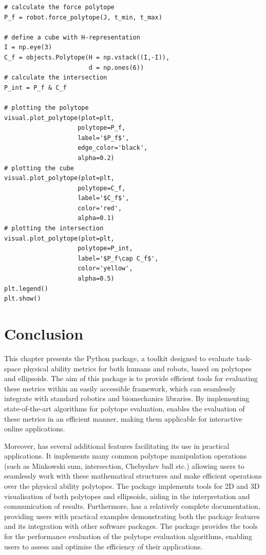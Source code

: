 {\begin{verbatim}
# calculate the force polytope
P_f = robot.force_polytope(J, t_min, t_max) 

# define a cube with H-representation
I = np.eye(3)
C_f = objects.Polytope(H = np.vstack((I,-I)), 
                       d = np.ones(6))  
# calculate the intersection
P_int = P_f & C_f
                    
# plotting the polytope
visual.plot_polytope(plot=plt, 
                    polytope=P_f, 
                    label='$P_f$',
                    edge_color='black',
                    alpha=0.2)
# plotting the cube
visual.plot_polytope(plot=plt, 
                    polytope=C_f,  
                    label='$C_f$',
                    color='red',
                    alpha=0.1)
# plotting the intersection
visual.plot_polytope(plot=plt, 
                    polytope=P_int, 
                    label='$P_f\cap C_f$',
                    color='yellow',
                    alpha=0.5)
plt.legend()
plt.show()
\end{verbatim}
}

\section{Conclusion}


This chapter presents the  Python package, a toolkit designed to evaluate task-space physical ability metrics for both humans and robots, based on polytopes and ellipsoids. The aim of this package is to provide efficient tools for evaluating these metrics within an easily accessible framework, which can seamlessly integrate with standard robotics and biomechanics libraries. By implementing state-of-the-art algorithms for polytope evaluation,  enables the evaluation of these metrics in an efficient manner, making them applicable for interactive online applications.

Moreover,  has several additional features facilitating its use in practical applications. It implements many common polytope manipulation operations (such as Minkowski sum, intersection, Chebyshev ball stc.) allowing users to seamlessly work with these mathematical structures and make efficient operations over the physical ability polytopes. The package implements tools for 2D and 3D visualisation of both polytopes and ellipsoids, aiding in the interpretation and communication of results. Furthermore,  has a relatively complete documentation, providing users with practical examples demonstrating both the package features and its integration with other software packages. The package provides the tools for the performance evaluation of the polytope evaluation algorithms, enabling users to assess and optimise the efficiency of their applications.

